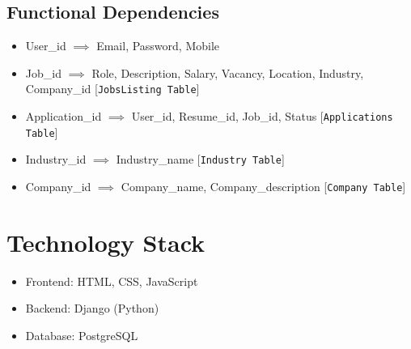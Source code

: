 \documentclass[12pt]{article}
\begin{document}
\subsection*{Functional Dependencies}
\begin{itemize}
    \item User\_id $\implies$ Email, Password, Mobile 
    \item Job\_id $\implies$ Role, Description, Salary, Vacancy, Location, Industry, Company\_id [\texttt{JobsListing Table}]
    \item Application\_id $\implies$ User\_id, Resume\_id, Job\_id, Status [\texttt{Applications Table}]
    \item Industry\_id $\implies$ Industry\_name [\texttt{Industry Table}]
    \item Company\_id $\implies$ Company\_name, Company\_description [\texttt{Company Table}]
\end{itemize}

\section*{Technology Stack}
\begin{itemize}
    \item Frontend: HTML, CSS, JavaScript
    \item Backend: Django (Python)
    \item Database: PostgreSQL
\end{itemize}
\end{document}
